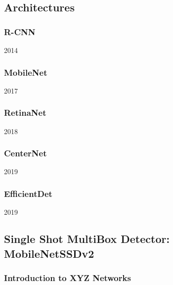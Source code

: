 \documentclass[
			   fontsize=11pt,
               paper=a4,
               bibliography=totoc,
               idxtotoc,
               headsepline,
               footsepline,
               footinclude=false,
               BCOR=12mm,
               DIV=13,
               openany,   %
               ]
               {scrbook}
\begin{document}

\subsection{Architectures}



\subsubsection{R-CNN}

2014
\cite{rcnnIntro}




\subsubsection{MobileNet}

2017


\subsubsection{RetinaNet}

2018


\subsubsection{CenterNet}

2019

\subsubsection{EfficientDet}

2019



\subsection{Single Shot MultiBox Detector: MobileNetSSDv2}

\subsubsection{Introduction to XYZ Networks}
\end{document}
